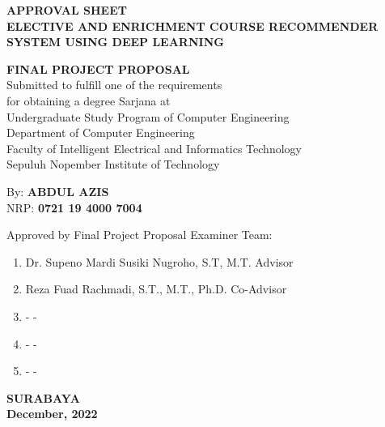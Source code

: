 {
\begin{center}
    \uppercase{\textbf{\large Approval Sheet}} \\

    \vspace*{10mm}
    \uppercase{\textbf{Elective and Enrichment Course Recommender System using Deep Learning}}
    \vspace*{10mm}

    {
        \uppercase{\textbf{Final Project Proposal}} \\
        Submitted to fulfill one of the requirements                  \\
        for obtaining a degree Sarjana at                             \\
        Undergraduate Study Program of Computer Engineering       \\
        Department of Computer Engineering                            \\
        Faculty of Intelligent Electrical and Informatics Technology  \\
        Sepuluh Nopember Institute of Technology                           \\
    }

    \vspace*{1.5cm}
    By: \textbf{\uppercase{Abdul Azis}}                                       \\
    NRP: \textbf{0721 19 4000 7004}                               \\
    \vspace*{1.5cm}

    Approved by Final Project Proposal Examiner Team:             \\
    \vspace*{5mm}

    \begin{enumerate}
        \setlength\itemsep{1.5em}
        \item Dr. Supeno Mardi Susiki Nugroho, S.T, M.T. \hfill Advisor
        \item Reza Fuad Rachmadi, S.T., M.T., Ph.D. \hfill Co-Advisor
        \item - \hfill -
        \item - \hfill -
        \item - \hfill -
    \end{enumerate}

    \vspace*{1.5cm}
    \uppercase{\textbf{surabaya}}                      \\
    \textbf{December, 2022}                               \\

\end{center}
}